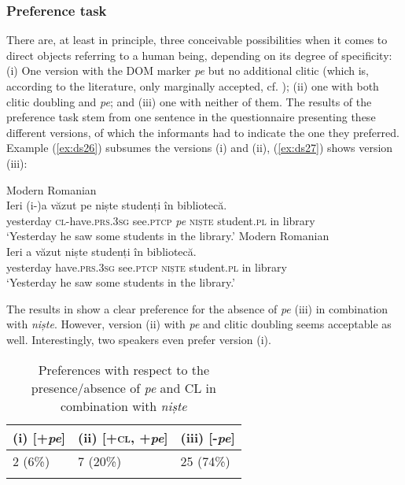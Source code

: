 \documentclass[output=paper,colorlinks,citecolor=brown]{langscibook}
\begin{document}
\subsubsection{Preference task}\label{sec:ds4.5.1}

There are, at least in principle, three conceivable possibilities when it comes to direct objects referring to a human being, depending on its degree of specificity: (i) One version with the DOM marker \textit{pe} but no additional clitic (which is, according to the literature, only marginally accepted, cf. ); (ii) one with both clitic doubling and \textit{pe}; and (iii) one with neither of them. The results of the preference task stem from one sentence in the questionnaire presenting these different versions, of which the informants had to indicate the one they preferred. Example (\ref{ex:ds26}) subsumes the versions (i) and (ii), (\ref{ex:ds27}) shows version (iii):

\ea\label{ex:ds26} Modern Romanian\\
\gll   Ieri     (i{}-)a             v\u{a}zut     pe niște studenți    în  bibliotec\u{a}.\\
     yesterday \textsc{cl}{}-have.\textsc{prs}.3\textsc{sg} see.\textsc{ptcp} \textit{pe} \textsc{niște} student.\textsc{pl} in library\\
\glt ‘Yesterday he saw some students in the library.’
\ex\label{ex:ds27} Modern Romanian\\
\gll Ieri     a        v\u{a}zut       niște studenți   în bibliotec\u{a}.\\
     yesterday have.\textsc{prs}.3\textsc{sg} see.\textsc{ptcp} \textsc{niște} student.\textsc{pl} in library\\
\glt ‘Yesterday he saw some students in the library.’
\z

The results in  show a clear preference for the absence of \textit{pe} (iii) in combination with \textit{niște}. However, version (ii) with \textit{pe} and clitic doubling seems acceptable as well. Interestingly, two speakers even prefer version (i).

\begin{table}
\begin{tabular}{lll}
\lsptoprule
(i) [+\textit{pe}] & (ii) [+\textsc{cl}, +\textit{pe}] & (iii) [-\textit{pe}]\\
\midrule
2 (6\%) & 7 (20\%) & 25 (74\%)\\
\lspbottomrule
\end{tabular}
\caption{Preferences with respect to the presence/absence of \textit{pe} and \textsc{CL} in combination with \textit{niște}}
\label{tab:ds7}
\end{table}
\end{document}
